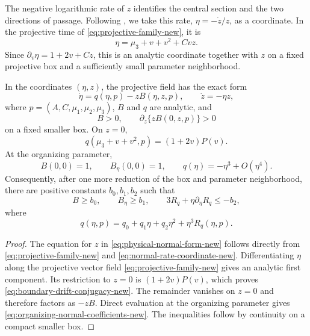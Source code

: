 The negative logarithmic rate of \(z\) identifies the central section
and the two directions of passage. Following \cite[Lemma~2.1]{HK2026},
we take this rate, \(\eta=-\dot z/z\), as a coordinate. In the projective time of
\eqref{eq:projective-family-new}, it is
\begin{equation}
\label{eq:normal-rate-coordinate-new}
 \eta=\mu _3+v+v^2+Cvz.
\end{equation}
Since $\partial_v\eta=1+2v+Cz$, this is an analytic coordinate together with
$z$ on a fixed projective box and a sufficiently small parameter
neighborhood.

\begin{lemma}
\label{lem:physical-normal-form-new}
In the coordinates $(\eta,z)$, the projective field has the exact form
\begin{equation}
\label{eq:physical-normal-form-new}
 \dot\eta=q(\eta,p)-zB(\eta,z,p),
 \qquad \dot z=-\eta z,
\end{equation}
where $p=(A,C,\mu _1,\mu _2,\mu _3)$, $B$ and $q$ are analytic, and
\begin{equation}
\label{eq:physical-normal-form-signs-new}
 B>0,\qquad \partial_z\{zB(0,z,p)\}>0
\end{equation}
on a fixed smaller box.  On $z=0$,
\begin{equation}
\label{eq:boundary-drift-conjugacy-new}
 q(\mu _3+v+v^2,p)=(1+2v)P(v).
\end{equation}
At the organizing parameter,
\begin{equation}
\label{eq:organizing-normal-coefficients-new}
 B(0,0)=1,\qquad B_\eta(0,0)=1,\qquad
 q(\eta)=-\eta^3+O(\eta^4).
\end{equation}
Consequently, after one more reduction of the box and parameter
neighborhood, there are positive constants $b_0,b_1,b_2$ such that
\begin{equation}
\label{eq:normal-sign-margins-new}
 B\ge b_0,\qquad B_\eta\ge b_1,\qquad
 3R_q+\eta\partial_\eta R_q\le-b_2,
\end{equation}
where
\begin{equation}
\label{eq:q-expansion-new}
 q(\eta,p)=q_0+q_1\eta+q_2\eta^2+\eta^3R_q(\eta,p).
\end{equation}
\end{lemma}

\begin{proof}
The equation for \(z\) in \eqref{eq:physical-normal-form-new} follows directly
from \eqref{eq:projective-family-new} and
\eqref{eq:normal-rate-coordinate-new}. Differentiating $\eta$ along the
projective vector field \eqref{eq:projective-family-new} gives an analytic first
component.  Its restriction to $z=0$ is
$(1+2v)P(v)$, which proves \eqref{eq:boundary-drift-conjugacy-new}.  The
remainder vanishes on $z=0$ and therefore factors as $-zB$.  Direct
evaluation at the organizing parameter gives
\eqref{eq:organizing-normal-coefficients-new}.  The inequalities follow by
continuity on a compact smaller box.
\end{proof}

